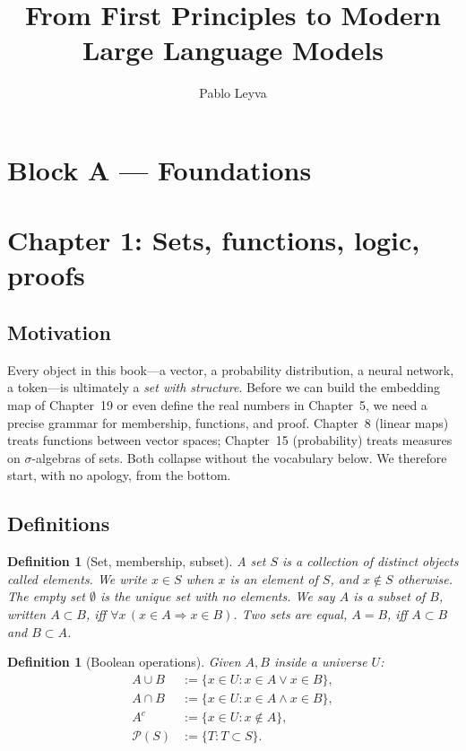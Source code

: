 \documentclass[11pt]{article}
\title{From First Principles to Modern Large Language Models}
\author{Pablo Leyva}
\date{}
\newtheorem{definition}[theorem]{Definition}
\theoremstyle{remark}
\begin{document}
\maketitle
\tableofcontents
\bigskip


\section*{Block A --- Foundations}

\section*{Chapter 1: Sets, functions, logic, proofs}

\subsection*{Motivation}

Every object in this book---a vector, a probability distribution, a neural network, a token---is ultimately a \emph{set with structure}. Before we can build the embedding map of Chapter~19 or even define the real numbers in Chapter~5, we need a precise grammar for membership, functions, and proof. Chapter~8 (linear maps) treats functions between vector spaces; Chapter~15 (probability) treats measures on $\sigma$-algebras of sets. Both collapse without the vocabulary below. We therefore start, with no apology, from the bottom.

\subsection*{Definitions}

\begin{definition}[Set, membership, subset]
A \emph{set} $S$ is a collection of distinct objects called elements. We write $x \in S$ when $x$ is an element of $S$, and $x \notin S$ otherwise. The \emph{empty set} $\emptyset$ is the unique set with no elements. We say $A$ is a \emph{subset} of $B$, written $A \subset B$, iff $\forall x\,(x \in A \Rightarrow x \in B)$. Two sets are equal, $A = B$, iff $A \subset B$ and $B \subset A$.
\end{definition}

\begin{definition}[Boolean operations]
Given $A, B$ inside a universe $U$:
\begin{align*}
A \cup B &:= \{x \in U : x \in A \lor x \in B\}, \\
A \cap B &:= \{x \in U : x \in A \land x \in B\}, \\
A^{c}    &:= \{x \in U : x \notin A\}, \\
\mathcal{P}(S) &:= \{T : T \subset S\}.
\end{align*}
\end{definition}
\end{document}
